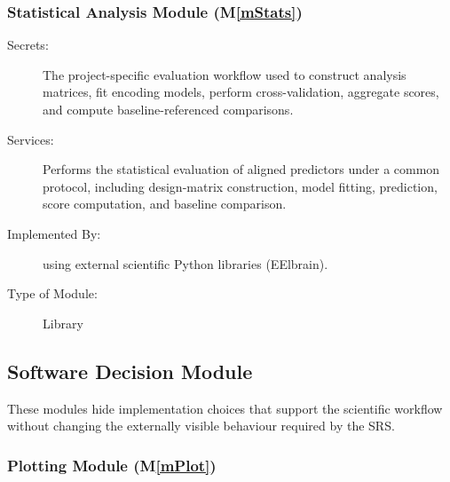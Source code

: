 \documentclass[12pt, titlepage]{article}
\newcommand{\mref}[1]{M\ref{#1}}
\begin{document}
\subsubsection{Statistical Analysis Module (\mref{mStats})}

\begin{description}
\item[Secrets:] The project-specific evaluation workflow used to construct
analysis matrices, fit encoding models, perform cross-validation, aggregate
scores, and compute baseline-referenced comparisons.
\item[Services:] Performs the statistical evaluation of aligned predictors under a common protocol, including design-matrix construction, model fitting, prediction, score computation, and baseline comparison.
\item[Implemented By:] \progname{} using external scientific Python libraries (EElbrain).
\item[Type of Module:] Library
\end{description}











\subsection{Software Decision Module}

These modules hide implementation choices that support the scientific workflow without changing the externally visible behaviour required by the SRS.


\subsubsection{Plotting Module (\mref{mPlot})}
\end{document}
